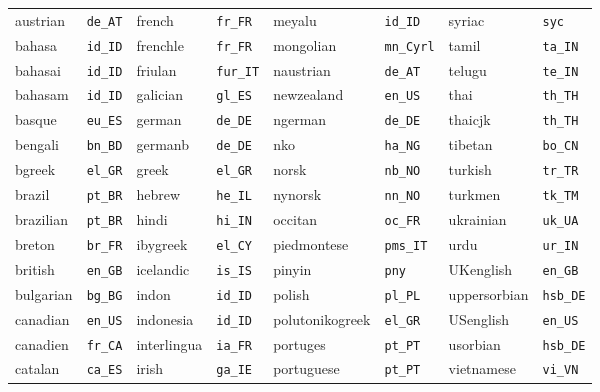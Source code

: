 \documentclass{ltxdockit}
\begin{document}
\begin{center}
\begin{tabular}{alalalal}
austrian   & \texttt{de\_AT}  & french      & \texttt{fr\_FR}  & meyalu          & \texttt{id\_ID} &   syriac          & \texttt{syc}\\
bahasa     & \texttt{id\_ID}  & frenchle    & \texttt{fr\_FR}  & mongolian       & \texttt{mn\_Cyrl} & tamil           & \texttt{ta\_IN}\\
bahasai    & \texttt{id\_ID}  & friulan     & \texttt{fur\_IT} & naustrian       & \texttt{de\_AT} &   telugu          & \texttt{te\_IN}\\
bahasam    & \texttt{id\_ID}  & galician    & \texttt{gl\_ES}  & newzealand      & \texttt{en\_US} &   thai            & \texttt{th\_TH}\\
basque     & \texttt{eu\_ES}  & german      & \texttt{de\_DE}  & ngerman         & \texttt{de\_DE} &   thaicjk         & \texttt{th\_TH}\\
bengali    & \texttt{bn\_BD}  & germanb     & \texttt{de\_DE}  & nko             & \texttt{ha\_NG} &   tibetan         & \texttt{bo\_CN}\\
bgreek     & \texttt{el\_GR}  & greek       & \texttt{el\_GR}  & norsk           & \texttt{nb\_NO} &   turkish         & \texttt{tr\_TR}\\
brazil     & \texttt{pt\_BR}  & hebrew      & \texttt{he\_IL}  & nynorsk         & \texttt{nn\_NO} &   turkmen         & \texttt{tk\_TM}\\
brazilian  & \texttt{pt\_BR}  & hindi       & \texttt{hi\_IN}  & occitan         & \texttt{oc\_FR} &   ukrainian       & \texttt{uk\_UA}\\
breton     & \texttt{br\_FR}  & ibygreek    & \texttt{el\_CY}  & piedmontese     & \texttt{pms\_IT} &  urdu            & \texttt{ur\_IN}\\
british    & \texttt{en\_GB}  & icelandic   & \texttt{is\_IS}  & pinyin          & \texttt{pny} &      UKenglish       & \texttt{en\_GB}\\
bulgarian  & \texttt{bg\_BG}  & indon       & \texttt{id\_ID}  & polish          & \texttt{pl\_PL} &   uppersorbian    & \texttt{hsb\_DE}\\
canadian   & \texttt{en\_US}  & indonesia   & \texttt{id\_ID}  & polutonikogreek & \texttt{el\_GR} &   USenglish       & \texttt{en\_US}\\
canadien   & \texttt{fr\_CA}  & interlingua & \texttt{ia\_FR}  & portuges        & \texttt{pt\_PT} &   usorbian        & \texttt{hsb\_DE}\\
catalan    & \texttt{ca\_ES}  & irish       & \texttt{ga\_IE}  & portuguese      & \texttt{pt\_PT} &   vietnamese      & \texttt{vi\_VN}\\

\end{tabular}
\end{center}
\end{document}
